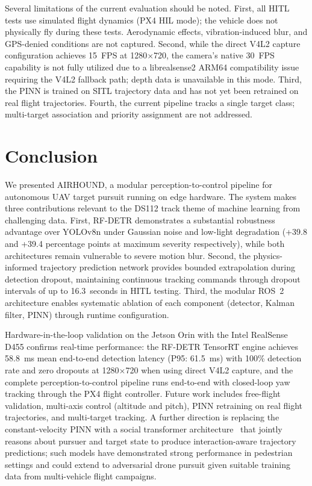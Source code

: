 \documentclass[11pt,letterpaper]{article}
\begin{document}
Several limitations of the current evaluation should be noted. First, all HITL tests use simulated flight dynamics (PX4 HIL mode); the vehicle does not physically fly during these tests. Aerodynamic effects, vibration-induced blur, and GPS-denied conditions are not captured. Second, while the direct V4L2 capture configuration achieves 15~FPS at 1280$\times$720, the camera's native 30~FPS capability is not fully utilized due to a librealsense2 ARM64 compatibility issue requiring the V4L2 fallback path; depth data is unavailable in this mode. Third, the PINN is trained on SITL trajectory data and has not yet been retrained on real flight trajectories. Fourth, the current pipeline tracks a single target class; multi-target association and priority assignment are not addressed.

\section{Conclusion}
\label{sec:conclusion}

We presented AIRHOUND, a modular perception-to-control pipeline for autonomous UAV target pursuit running on edge hardware. The system makes three contributions relevant to the DS112 track theme of machine learning from challenging data. First, RF-DETR demonstrates a substantial robustness advantage over YOLOv8n under Gaussian noise and low-light degradation (+39.8 and +39.4 percentage points at maximum severity respectively), while both architectures remain vulnerable to severe motion blur. Second, the physics-informed trajectory prediction network provides bounded extrapolation during detection dropout, maintaining continuous tracking commands through dropout intervals of up to 16.3~seconds in HITL testing. Third, the modular ROS~2 architecture enables systematic ablation of each component (detector, Kalman filter, PINN) through runtime configuration.

Hardware-in-the-loop validation on the Jetson Orin with the Intel RealSense D455 confirms real-time performance: the RF-DETR TensorRT engine achieves 58.8~ms mean end-to-end detection latency (P95: 61.5~ms) with 100\% detection rate and zero dropouts at 1280$\times$720 when using direct V4L2 capture, and the complete perception-to-control pipeline runs end-to-end with closed-loop yaw tracking through the PX4 flight controller. Future work includes free-flight validation, multi-axis control (altitude and pitch), PINN retraining on real flight trajectories, and multi-target tracking.  A further direction is replacing the constant-velocity PINN with a social transformer architecture~\cite{giuliari2021transformer} that jointly reasons about pursuer and target state to produce interaction-aware trajectory predictions; such models have demonstrated strong performance in pedestrian settings and could extend to adversarial drone pursuit given suitable training data from multi-vehicle flight campaigns.
\end{document}
